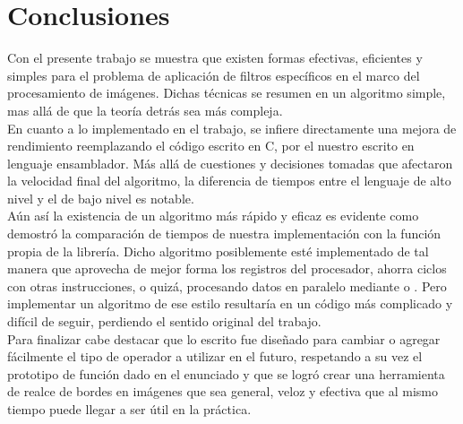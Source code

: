 \section{Conclusiones}

Con el presente trabajo se muestra que existen formas efectivas, eficientes y simples para el problema de aplicaci\'on 
de filtros espec\'ificos en el marco del procesamiento de im\'agenes. Dichas t\'ecnicas se resumen en un algoritmo simple, 
mas all\'a de que la teor\'ia detr\'as sea m\'as compleja. \\

En cuanto a lo implementado en el trabajo, se infiere directamente una mejora de rendimiento reemplazando el c\'odigo 
escrito en C, por el nuestro escrito en lenguaje ensamblador. M\'as all\'a de cuestiones  y decisiones tomadas que 
afectaron la velocidad final del algoritmo, la diferencia de tiempos entre el lenguaje de alto nivel y el de bajo 
nivel es notable. \\

A\'un as\'i la existencia de un algoritmo m\'as r\'apido y eficaz es evidente como demostr\'o la comparaci\'on de tiempos de 
nuestra implementaci\'on con la funci\'on propia de la librer\'ia. Dicho algoritmo posiblemente est\'e implementado de tal 
manera que aprovecha de mejor forma los registros del procesador, ahorra ciclos con otras instrucciones, o quiz\'a, 
procesando datos en paralelo mediante  o . Pero implementar un algoritmo de ese estilo resultar\'ia en un c\'odigo m\'as 
complicado y dif\'icil de seguir, perdiendo el sentido original del trabajo. \\

Para finalizar cabe destacar que lo escrito fue diseñado para cambiar o agregar f\'acilmente el tipo de operador a 
utilizar en el futuro, respetando a su vez el prototipo de funci\'on dado en el enunciado y que se logr\'o crear una 
herramienta de realce de bordes en im\'agenes que sea general, veloz y efectiva  que al mismo tiempo puede llegar a 
ser \'util en la pr\'actica.
\pagebreak
